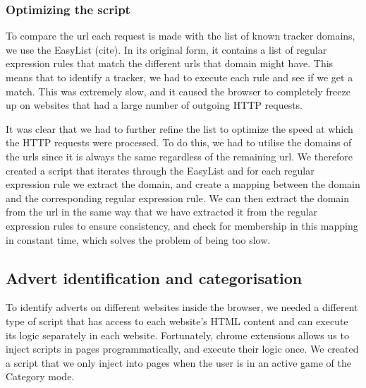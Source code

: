 \documentclass{l4proj}
\begin{document}
\subsubsection{Optimizing the script}
To compare the url each request is made with the list of known tracker domains, we use the EasyList (cite). In its original form, it contains a list of regular expression rules that match the different urls that domain might have. This means that to identify a tracker, we had to execute each rule and see if we get a match. This was extremely slow, and it caused the browser to completely freeze up on websites that had a large number of outgoing HTTP requests.

It was clear that we had to further refine the list to optimize the speed at which the HTTP requests were processed. To do this, we had to utilise the domains of the urls since it is always the same regardless of the remaining url. We therefore created a script that iterates through the EasyList and for each regular expression rule we extract the domain, and create a mapping between the domain and the corresponding regular expression rule. We can then extract the domain from the url in the same way that we have extracted it from the regular expression rules to ensure consistency, and check for membership in this mapping in constant time, which solves the problem of being too slow.

\subsection{Advert identification and categorisation}
To identify adverts on different websites inside the browser, we needed a different type of script that has access to each website's HTML content and can execute its logic separately in each website. Fortunately, chrome extensions allows us to inject scripts in pages programmatically, and execute their logic once. We created a script that we only inject into pages when the user is in an active game of the Category mode. 
\end{document}
